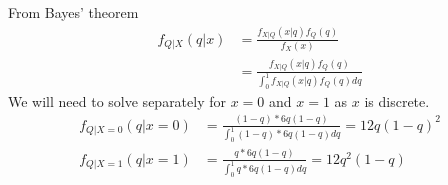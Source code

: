 \documentclass[../../probability-notes.tex]{subfile}
\begin{document}
        From Bayes' theorem 
        \begin{align*}
            f_{Q|X}(q|x) &= \frac{f_{X|Q}(x|q) f_{Q}(q)}{f_{X}(x)}\\
                        &= \frac{f_{X|Q}(x|q) f_{Q}(q)}{\int_{0}^{1} f_{X|Q}(x|q) f_{Q}(q) dq}
        \end{align*}
        We will need to solve separately for $x = 0$ and $x = 1$ as $x$ is discrete.
        \begin{align*}
            f_{Q|X=0}(q|x=0) &= \frac{(1-q)* 6q(1-q)}{\int_{0}^{1} (1-q)*6q(1-q) dq} = 12q(1-q)^{2}\\
            f_{Q|X=1}(q|x=1) &= \frac{q* 6q(1-q)}{\int_{0}^{1} q*6q(1-q) dq} = 12q^{2}(1-q)
        \end{align*}
\end{document}
